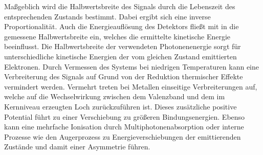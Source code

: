             Maßgeblich wird die Halbwertsbreite des Signals durch die Lebenszeit des entsprechenden Zustands bestimmt.
            Dabei ergibt sich eine inverse Proportionalität.
            Auch die Energieauflösung des Detektors fließt mit in die gemessene Halbwertsbreite ein, welches die ermittelte kinetische Energie beeinflusst.
            Die Halbwertsbreite der verwendeten Photonenenergie sorgt für unterschiedliche kinetische Energien der vom gleichen Zustand emittierten Elektronen.
            Durch Vermessen des Systems bei niedrigen Temperaturen kann eine Verbreiterung des Signals auf Grund von der Reduktion thermischer Effekte vermindert werden.
            Vermehrt treten bei Metallen einseitige Verbreiterungen auf, welche auf die Wechselwirkung zwischen dem Valenzband und dem im Kernniveau erzeugten Loch zurückzuführen ist.
            Dieses zusätzliche positive Potential führt zu einer Verschiebung zu größeren Bindungsenergien.
            Ebenso kann eine mehrfache Ionisation durch Multiphotonenabsorption oder interne Prozesse wie den Augerprozess zu Energieverschiebungen der emittierenden Zustände und damit einer Asymmetrie führen.

